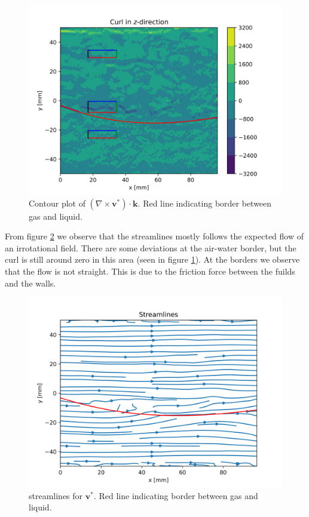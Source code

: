 \documentclass[a4paper,10pt,english]{article}
\begin{document}
\begin{figure}[h!]
    \centering
    \includegraphics[scale=0.65]{../figures/task_e_curl.png}
    \caption{Contour plot of $(\nabla \times \bm{v}^*) \cdot \bm{k}$. Red line indicating border between gas and liquid.}
    \label{fig:contour_curl}
\end{figure}

From figure \ref{fig:streamlines} we observe that the streamlines mostly follows the expected flow of an irrotational field. There are some deviations at the air-water border, but the curl is still around zero in this area (seen in figure \ref{fig:contour_curl}). At the borders we observe that the flow is not straight. This is due to the friction force between the fuilds and the walls. 

\begin{figure}[h!]
    \centering
    \includegraphics[scale=0.65]{../figures/task_e_streamlines.png}
    \caption{streamlines for $\bm{v}^*$. Red line indicating border between gas and liquid.}
    \label{fig:streamlines}
\end{figure}
\end{document}
